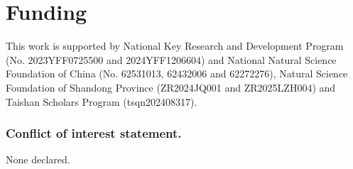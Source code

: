 \documentclass[11pt,a4paper]{article}
\begin{document}
\section{Funding}
This work is supported by National Key Research and Development Program (No. 2023YFF0725500 and 2024YFF1206604) and National Natural Science Foundation of China (No. 62531013, 62432006 and 62272276),  Natural Science Foundation of Shandong Province (ZR2024JQ001 and ZR2025LZH004) and Taishan Scholars Program (tsqn202408317).

\subsubsection{Conflict of interest statement.} 
None declared.


% 







\end{document}
